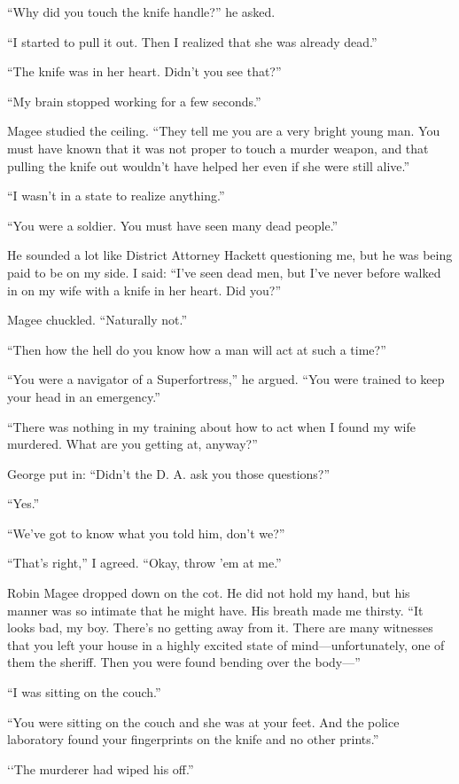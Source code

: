 \documentclass{novel}
\begin{document}
“Why did you touch the knife handle?” he asked.

“I started to pull it out. Then I realized that she was already dead.”

“The knife was in her heart. Didn’t you see that?”

“My brain stopped working for a few seconds.”

Magee studied the ceiling. “They tell me you are a very bright young man. You must have known that it was not proper to touch a murder weapon, and that pulling the knife out wouldn’t have helped her even if she were still alive.”

“I wasn’t in a state to realize anything.”

“You were a soldier. You must have seen many dead people.”

He sounded a lot like District Attorney Hackett questioning me, but he was being paid to be on my side. I said: “I’ve seen dead men, but I’ve never before walked in on my wife with a knife in her heart. Did you?”

Magee chuckled. “Naturally not.”

“Then how the hell do you know how a man will act at such a time?”

“You were a navigator of a Superfortress,” he argued. “You were trained to keep your head in an emergency.”

“There was nothing in my training about how to act when I found my wife murdered. What are you getting at, anyway?”

George put in: “Didn’t the D. A. ask you those questions?”

“Yes.”

“We’ve got to know what you told him, don’t we?”

“That’s right,” I agreed. “Okay, throw ’em at me.”

Robin Magee dropped down on the cot. He did not hold my hand, but his manner was so intimate that he might have. His breath made me thirsty. “It looks bad, my boy. There’s no getting away from it. There are many witnesses that you left your house in a highly excited state of mind—unfortunately, one of them the sheriff. Then you were found bending over the body—”

“I was sitting on the couch.”

“You were sitting on the couch and she was at your feet. And the police laboratory found your fingerprints on the knife and no other prints.”

‘‘The murderer had wiped his off.”
\end{document}

